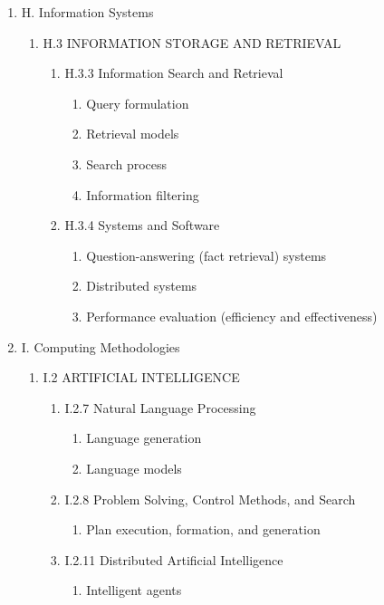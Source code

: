 \documentclass[oneside,a4paper,12pt]{report}
\begin{document}
\begin{enumerate}
	\item H. Information Systems
	\begin{enumerate}
		\item H.3 INFORMATION STORAGE AND RETRIEVAL
		\begin{enumerate}
			\item H.3.3 Information Search and Retrieval
			\begin{enumerate}
				\item Query formulation
				\item Retrieval models
				\item Search process
				\item Information filtering
			\end{enumerate}
			\item H.3.4 Systems and Software
			\begin{enumerate}
				\item Question-answering (fact retrieval) systems
				\item Distributed systems
				\item Performance evaluation (efficiency and effectiveness)
			\end{enumerate}
		\end{enumerate}
	\end{enumerate}
	\item I. Computing Methodologies
	\begin{enumerate}
		\item I.2 ARTIFICIAL INTELLIGENCE
		\begin{enumerate}
			\item I.2.7 Natural Language Processing
			\begin{enumerate}
				\item Language generation
				\item Language models
			\end{enumerate}
			\item I.2.8 Problem Solving, Control Methods, and Search
			\begin{enumerate}
				\item Plan execution, formation, and generation
			\end{enumerate}
			\item I.2.11 Distributed Artificial Intelligence
			\begin{enumerate}
				\item Intelligent agents
			\end{enumerate}
		\end{enumerate}
	\end{enumerate}
\end{enumerate}
\end{document}
